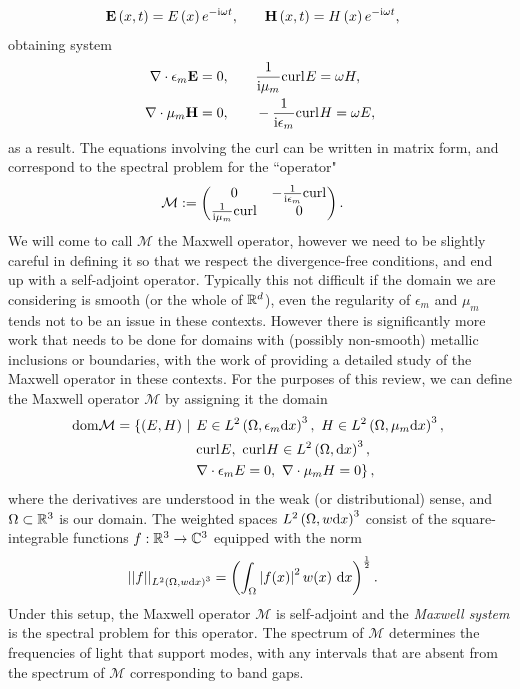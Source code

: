 \begin{align*}
	\mathbf{E}\left( x,t \right) = E\left( x \right)e^{-\mathrm{i}\omega t},
	&\qquad \mathbf{H}\left( x,t \right) = H\left( x \right)e^{-\mathrm{i}\omega t},
\end{align*}
obtaining system
\begin{align*}
	\nabla\cdot \epsilon_m \mathbf{E} = 0,
	&\qquad \frac{1}{\mathrm{i}\mu_m}\mathrm{curl}_{}E = \omega H, \\ 
	\nabla\cdot \mu_m \mathbf{H} = 0,
	&\qquad -\frac{1}{\mathrm{i}\epsilon_m}\mathrm{curl}_{}H = \omega E,
\end{align*}
as a result.
The equations involving the curl can be written in matrix form, and correspond to the spectral problem for the ``operator" 
\begin{align} \label{eq:Intro-MaxwellInMatrxForm}
	\mathcal{M} &:=
	\begin{pmatrix}
		0 & -\frac{1}{\mathrm{i}\epsilon_m}\mathrm{curl}_{} \\
		\frac{1}{\mathrm{i}\mu_m}\mathrm{curl}_{} & 0
	\end{pmatrix}.
\end{align}
We will come to call $\mathcal{M}$ the Maxwell operator, however we need to be slightly careful in defining it so that we respect the divergence-free conditions, and end up with a self-adjoint operator.
Typically this not difficult if the domain we are considering is smooth (or the whole of $\mathbb{R}^d$), even the regularity of $\epsilon_m$ and $\mu_m$ tends not to be an issue in these contexts.
However there is significantly more work that needs to be done for domains with (possibly non-smooth) metallic inclusions or boundaries, with the work of \cite{birman1987l2, birman1989selfadjoint} providing a detailed study of the Maxwell operator in these contexts.
For the purposes of this review, we can define the Maxwell operator $\mathcal{M}$ by assigning it the domain
\begin{align*}
	\mathrm{dom}{\mathcal{M}} = \left\{ \left( E,H \right) \ \middle\vert \right. 
	&
	\left. E\in L^2\left( \Omega, \epsilon_m\mathrm{d} x \right)^3, \ H\in L^2\left( \Omega, \mu_m\mathrm{d} x \right)^3, \right. \\
	&
	\left. \mathrm{curl}_{}E, \ \mathrm{curl}_{}H\in L^{2}\left( \Omega,\mathrm{d} x \right)^3, \right. \\
	&
	\left. \nabla\cdot \epsilon_m E = 0, \ \nabla\cdot \mu_m H = 0 \right\},
\end{align*}
where the derivatives are understood in the weak (or distributional) sense, and $\Omega\subset\mathbb{R}^3$ is our domain.
The weighted spaces $L^2\left( \Omega, w\mathrm{d} x \right)^3$ consist of the square-integrable functions $f:\mathbb{R}^3\rightarrow\mathbb{C}^3$ equipped with the norm
\begin{align*}
	\lvert\lvert  f  \rvert\rvert_{L^2\left( \Omega, w\mathrm{d} x \right)^3} &= \left(  \int_{\Omega}\left\lvert f(x) \right\rvert^2 w(x) \ \mathrm{d}x  \right)^{\frac{1}{2}}.
\end{align*}
Under this setup, the Maxwell operator $\mathcal{M}$ is self-adjoint and the \emph{Maxwell system} is the spectral problem for this operator.
The spectrum of $\mathcal{M}$ determines the frequencies of light that support modes, with any intervals that are absent from the spectrum of $\mathcal{M}$ corresponding to band gaps.

